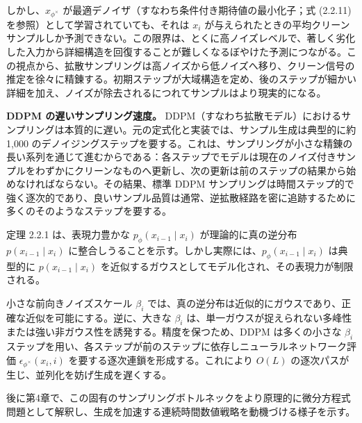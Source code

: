 しかし、$x_{\phi^\times}$ が最適デノイザ（すなわち条件付き期待値の最小化子；式 (2.2.11) を参照）として学習されていても、それは $x_i$ が与えられたときの平均クリーンサンプルしか予測できない。この限界は、とくに高ノイズレベルで、著しく劣化した入力から詳細構造を回復することが難しくなるぼやけた予測につながる。この視点から、拡散サンプリングは高ノイズから低ノイズへ移り、クリーン信号の推定を徐々に精錬する。初期ステップが大域構造を定め、後のステップが細かい詳細を加え、ノイズが除去されるにつれてサンプルはより現実的になる。



\textbf{DDPM の遅いサンプリング速度。} DDPM（すなわち拡散モデル）におけるサンプリングは本質的に遅い。元の定式化と実装では、サンプル生成は典型的に約 1,000 のデノイジングステップを要する。これは、サンプリングが小さな精錬の長い系列を通じて進むからである：各ステップでモデルは現在のノイズ付きサンプルをわずかにクリーンなものへ更新し、次の更新は前のステップの結果から始めなければならない。その結果、標準 DDPM サンプリングは時間ステップ的で強く逐次的であり、良いサンプル品質は通常、逆拡散経路を密に追跡するために多くのそのようなステップを要する。

定理 2.2.1 は、表現力豊かな $p_\phi(x_{i-1}\mid x_i)$ が理論的に真の逆分布 $p(x_{i-1}\mid x_i)$ に整合しうることを示す。しかし実際には、$p_\phi(x_{i-1}\mid x_i)$ は典型的に $p(x_{i-1}\mid x_i)$ を近似するガウスとしてモデル化され、その表現力が制限される。

小さな前向きノイズスケール $\beta_i$ では、真の逆分布は近似的にガウスであり、正確な近似を可能にする。逆に、大きな $\beta_i$ は、単一ガウスが捉えられない多峰性または強い非ガウス性を誘発する。精度を保つため、DDPM は多くの小さな $\beta_i$ ステップを用い、各ステップが前のステップに依存しニューラルネットワーク評価 $\epsilon_{\phi^\times}(x_i,i)$ を要する逐次連鎖を形成する。これにより $O(L)$ の逐次パスが生じ、並列化を妨げ生成を遅くする。

後に第4章で、この固有のサンプリングボトルネックをより原理的に微分方程式問題として解釈し、生成を加速する連続時間数値戦略を動機づける様子を示す。

